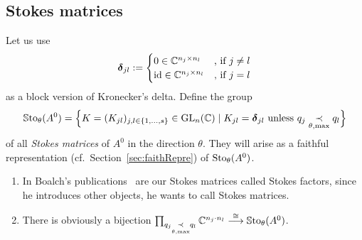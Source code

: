 \subsection{Stokes matrices}\label{sec:matrixReps}
\begin{defn}\label{defn:groupOfFaithfullReps}
  Let us use
  \[
    \boldsymbol{\delta}_{jl}:=
    \begin{cases}
      0 \in \mathbb{C}^{n_j\times n_l} & \text{,~if~} j\neq l
    \\\operatorname{id} \in \mathbb{C}^{n_j\times n_l} & \text{,~if~} j=l
    \end{cases}
  \]
  as a block version of Kronecker's delta.
  Define the group
  \begin{align*}
    \operatorname{\mathbb{S}to}_\theta(A^0)= \Big\{K=(K_{jl})_{j,l\in\{1,\dots,s\}}\in\operatorname{GL}_n(\mathbb{C}) \mid
      K_{jl}=\boldsymbol{\delta}_{jl} \text{~unless~}
      q_j \underset{\theta,\max}{\prec} q_l \Big\}
  \end{align*}
  of all \emph{Stokes matrices} of $A^0$ in the direction $\theta$.
  They will arise as a faithful representation
  (cf.\ Section~\ref{sec:faithRepre}) of $\operatorname{Sto}_\theta(A^0)$.
  \begin{s-rem}
    \begin{enumerate}
      \item In Boalch's publications~\cite{boalch,thboalch} are our Stokes
        matrices called Stokes factors, since he introduces other objects, he
        wants to call Stokes matrices.
      \item There is obviously a bijection
        $\prod_{q_j \underset{\theta,\max}{\prec} q_l}\mathbb{C}^{n_j \cdot n_l}
        \overset{\cong}{\longrightarrow} \operatorname{\mathbb{S}to}_\theta(A^0)$.
    \end{enumerate}
  \end{s-rem}
\iffalse

\end{defn}
